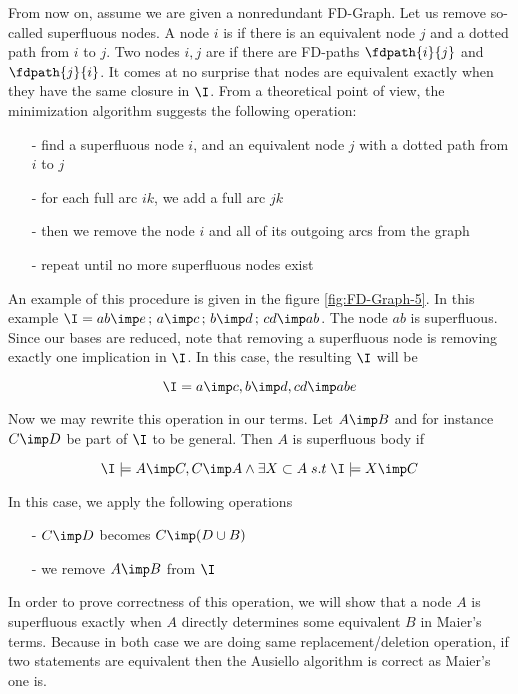 From now on, assume we are given a nonredundant FD-Graph. Let us remove so-called superfluous nodes. A node $i$ is  if there is an equivalent node $j$ and a dotted path from $i$ to $j$. Two nodes $i, j$ are  if there are FD-paths $\fdpath{i}{j}$ and $\fdpath{j}{i}$.
It comes at no surprise that nodes are equivalent exactly when they have the
same closure in $\I$. From a theoretical point of view, the minimization algorithm suggests the following operation:
\begin{itemize}
	\item[-] find a superfluous node $i$, and an equivalent node $j$ with a dotted
	path from $i$ to $j$
	\item[-] for each full arc $ik$, we add a full arc $jk$
	\item[-] then we remove the node $i$ and all of its outgoing arcs from the 
	graph
	\item[-] repeat until no more superfluous nodes exist
\end{itemize}
\noindent An example of this procedure is given in the figure
\ref{fig:FD-Graph-5}. In this example $\I = {ab \imp e \, ; \, a \imp c
	\, ; \, b \imp d \, ; \, cd \imp ab}$. The node $ab$ is superfluous. Since 
our
bases are reduced, note that removing a superfluous node is removing exactly 
one implication in $\I$. In this case, the resulting $\I$ will be

\[ \I = {a \imp c, b \imp d, cd \imp abe} \] 


\begin{figure}[ht]

\end{figure}


\noindent Now we may rewrite this operation in our terms. Let $A \imp B$ and 
for instance $C \imp D$ be part of $\I$ to be general. Then $A$ is superfluous
body if

\[ \I \models A \imp C, C \imp A \land \exists X \subset A \; s.t \;
\I \models X \imp C \]

\noindent In this case, we apply the following operations
\begin{itemize}
	\item[-] $C \imp D$ becomes $C \imp (D \cup B)$
	\item[-] we remove $A \imp B$ from $\I$
\end{itemize}

\noindent In order to prove correctness of this operation, we will show that
a node $A$ is superfluous exactly when $A$ directly determines some equivalent
$B$ in Maier's terms. Because in both case we are doing same replacement/deletion operation, if two statements are equivalent then the Ausiello algorithm is correct as Maier's one is.


